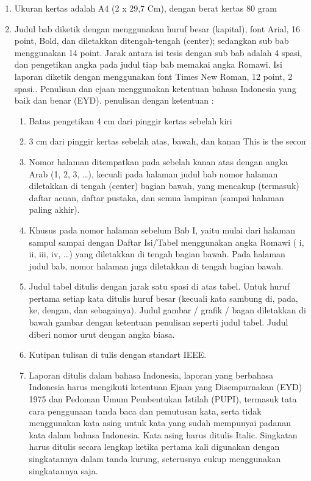 \begin{enumerate}
\item Ukuran kertas adalah A4 (2 x 29,7 Cm), dengan berat kertas 80 gram
\item Judul bab diketik dengan menggunakan huruf besar (kapital), font Arial, 16 point, Bold, dan diletakkan ditengah-tengah (center); sedangkan sub bab menggunakan 14 point. Jarak antara isi tesis dengan sub bab adalah 4 spasi, dan pengetikan angka pada judul tiap bab memakai angka Romawi. Isi laporan diketik dengan menggunakan font Times New Roman, 12 point, 2 spasi.. Penulisan dan ejaan menggunakan ketentuan bahasa Indonesia yang baik dan benar (EYD). penulisan dengan ketentuan : \begin{enumerate}
\item Batas pengetikan 4 cm dari pinggir kertas sebelah kiri
\item 3 cm dari pinggir kertas sebelah atas, bawah, dan kanan
This is the secon
\item Nomor halaman ditempatkan pada sebelah kanan atas dengan angka Arab (1, 2, 3, …), kecuali pada halaman judul bab nomor halaman diletakkan di tengah (center) bagian bawah, yang mencakup (termasuk) daftar acuan, daftar pustaka, dan semua lampiran (sampai halaman paling akhir).
\item Khusus pada nomor halaman sebelum Bab I, yaitu mulai dari halaman sampul sampai dengan Daftar Isi/Tabel menggunakan angka Romawi ( i, ii, iii, iv, …) yang diletakkan di tengah bagian bawah. Pada halaman judul bab, nomor halaman juga diletakkan di tengah bagian bawah.
\item Judul tabel ditulis dengan jarak satu spasi di atas tabel. Untuk huruf pertama setiap kata ditulis huruf besar (kecuali kata sambung di, pada, ke, dengan, dan sebagainya). Judul gambar / grafik / bagan diletakkan di bawah gambar dengan ketentuan penulisan seperti judul tabel. Judul diberi nomor urut dengan angka biasa.
\item Kutipan tulisan di tulis dengan standart IEEE.
\item Laporan ditulis dalam bahasa Indonesia, laporan yang berbahasa Indonesia harus mengikuti ketentuan Ejaan yang Disempurnakan (EYD) 1975 dan Pedoman Umum Pembentukan Istilah (PUPI), termasuk tata cara penggunaan tanda baca dan pemutusan kata, serta tidak menggunakan kata asing untuk kata yang sudah mempunyai padanan kata dalam bahasa Indonesia. Kata asing harus ditulis Italic. Singkatan harus ditulis secara lengkap ketika pertama kali digunakan dengan singkatannya dalam tanda kurung, seterusnya cukup menggunakan singkatannya saja.
\end{enumerate}

\end{enumerate}
